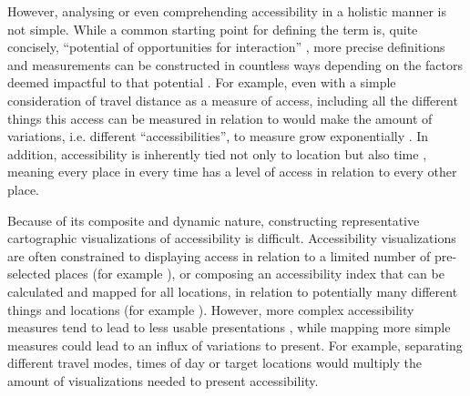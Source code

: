 However, analysing or even comprehending accessibility
in a holistic manner is not simple.
While a common starting point for defining the term is, quite concisely,
\enquote{potential of opportunities for interaction} \parencite{han1959},  %
more precise definitions and measurements can be constructed in countless ways
depending on the factors deemed impactful to that potential
\parencite{pap2016}.
For example, even with a simple consideration of travel distance as a measure of access,
including all the different things this access can be measured in relation to
would make the amount of variations, i.e. different \enquote{accessibilities},
to measure grow exponentially \parencite{lev2020}.
In addition, accessibility is inherently tied not only to location
but also time \parencite{jar2018},
meaning every place in every time has a level of access
in relation to every other place.

Because of its composite and dynamic nature,
constructing representative cartographic visualizations of accessibility is difficult.
Accessibility visualizations are often constrained
to displaying access in relation to
a limited number of pre-selected places (for example \textcite{wei2018}),
or composing an accessibility index
that can be calculated and mapped for all locations,
in relation to potentially many different things and locations
(for example \textcite{kim2019}).
However, more complex accessibility measures tend to lead to
less usable presentations \parencite{te2014},
while mapping more simple measures could lead to an influx of variations to present.
For example, separating different travel modes, times of day or target locations
would multiply the amount of visualizations needed to present accessibility.



